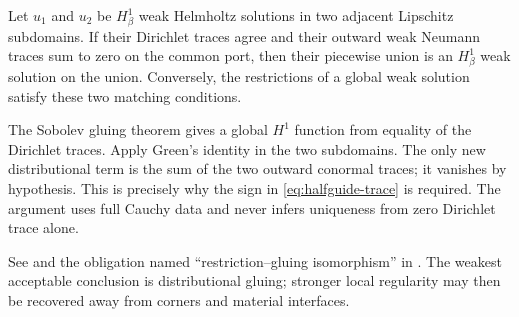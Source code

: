 \begin{lemma}
\label{lem:weak-gluing}
Let $u_1$ and $u_2$ be $H^1_\beta$ weak Helmholtz solutions in two adjacent
Lipschitz subdomains.  If their Dirichlet traces agree and their outward weak
Neumann traces sum to zero on the common port, then their piecewise union is an
$H^1_\beta$ weak solution on the union.  Conversely, the restrictions of a
global weak solution satisfy these two matching conditions.
\end{lemma}
\begin{proofroadmap}
The Sobolev gluing theorem gives a global $H^1$ function from equality of the
Dirichlet traces.  Apply Green's identity in the two subdomains.  The only new
distributional term is the sum of the two outward conormal traces; it vanishes
by hypothesis.  This is precisely why the sign in \eqref{eq:halfguide-trace} is
required.  The argument uses full Cauchy data and never infers uniqueness from
zero Dirichlet trace alone.

See  and
the obligation named ``restriction--gluing isomorphism'' in
.  The weakest
acceptable conclusion is distributional gluing; stronger local regularity may
then be recovered away from corners and material interfaces.
\end{proofroadmap}
